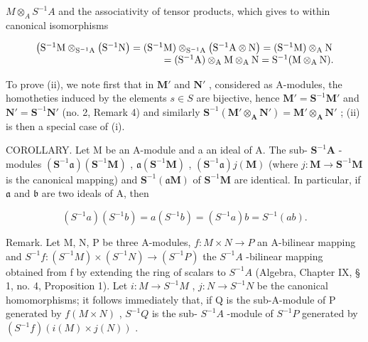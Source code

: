 \(M \otimes_{A} S^{-1} A\) and the associativity of tensor products, which gives to within canonical isomorphisms

\[
\begin{array}{r l} \left(\mathrm{S} ^ {- 1} \mathrm{M} \otimes_ {\mathrm{S} ^ {- 1} \mathrm{A}} \left(\mathrm{S} ^ {- 1} \mathrm{N}\right) = (\mathrm{S} ^ {- 1} \mathrm{M}) \otimes_ {\mathrm{S} ^ {- 1} \mathrm{A}} \left(\mathrm{S} ^ {- 1} \mathrm{A} \otimes \mathrm{N}\right) = (\mathrm{S} ^ {- 1} \mathrm{M}) \otimes_ {\mathrm{A}} \mathrm{N} \right. \\ = (\mathrm{S} ^ {- 1} \mathrm{A}) \otimes_ {\mathrm{A}} \mathrm{M} \otimes_ {\mathrm{A}} \mathrm{N} = \mathrm{S} ^ {- 1} (\mathrm{M} \otimes_ {\mathrm{A}} \mathrm{N}). \end{array}
\]

To prove (ii), we note first that in \(\mathbf{M}'\) and \(\mathbf{N}'\) , considered as A-modules, the homotheties induced by the elements \(s \in S\) are bijective, hence \(\mathbf{M}' = \mathbf{S}^{-1}\mathbf{M}'\) and \(\mathbf{N}' = \mathbf{S}^{-1}\mathbf{N}'\) (no. 2, Remark 4) and similarly \(\mathbf{S}^{-1}(\mathbf{M}' \otimes_{\mathbf{A}} \mathbf{N}') = \mathbf{M}' \otimes_{\mathbf{A}} \mathbf{N}'\) ; (ii) is then a special case of (i).

COROLLARY. Let M be an A-module and a an ideal of A. The sub- \(\mathbf{S}^{-1}\mathbf{A}\) -modules \((\mathbf{S}^{-1}\mathfrak{a})(\mathbf{S}^{-1}\mathbf{M})\) , \(\mathfrak{a}(\mathbf{S}^{-1}\mathbf{M})\) , \((\mathbf{S}^{-1}\mathfrak{a})j(\mathbf{M})\) (where \(j: \mathbf{M} \to \mathbf{S}^{-1}\mathbf{M}\) is the canonical mapping) and \(\mathbf{S}^{-1}(\mathfrak{a}\mathbf{M})\) of \(\mathbf{S}^{-1}\mathbf{M}\) are identical. In particular, if \(\mathfrak{a}\) and \(\mathfrak{b}\) are two ideals of A, then

\[
(S ^ {- 1} a) (S ^ {- 1} b) = a (S ^ {- 1} b) = (S ^ {- 1} a) b = S ^ {- 1} (a b).
\]

Remark. Let M, N, P be three A-modules, \(f: M \times N \to P\) an A-bilinear mapping and \(S^{-1}f: (S^{-1}M) \times (S^{-1}N) \to (S^{-1}P)\) the \(S^{-1}A\) -bilinear mapping obtained from f by extending the ring of scalars to \(S^{-1}A\) (Algebra, Chapter IX, § 1, no. 4, Proposition 1). Let \(i: M \to S^{-1}M\) , \(j: N \to S^{-1}N\) be the canonical homomorphisms; it follows immediately that, if Q is the sub-A-module of P generated by \(f(M \times N)\) , \(S^{-1}Q\) is the sub- \(S^{-1}A\) -module of \(S^{-1}P\) generated by \((S^{-1}f)(i(M) \times j(N))\) .

